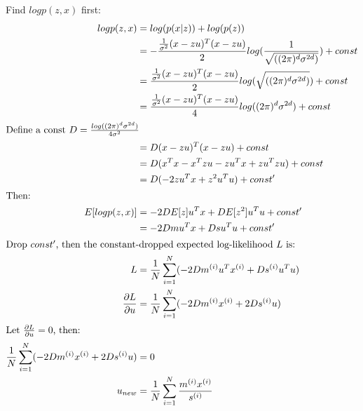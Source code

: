 \documentclass{article}
\begin{document}
\subsection{}
Find $logp(z,x)$ first:
\begin{align*}
    logp(z,x) &= log(p(x|z))+log(p(z))\\
    &= -\frac{\frac{1}{\sigma ^2}(x-zu)^T(x-zu)}{2}log(\frac{1}{\sqrt{((2\pi )^d\sigma ^{2d})}}) + const\\
    &= \frac{\frac{1}{\sigma ^2}(x-zu)^T(x-zu)}{2}log(\sqrt{((2\pi )^d\sigma ^{2d})}) + const\\
    &= \frac{\frac{1}{\sigma ^2}(x-zu)^T(x-zu)}{4}log((2\pi )^d\sigma ^{2d}) + const\\
\intertext{Define a const $D = \frac{log((2\pi )^d\sigma ^{2d})}{4\sigma ^2}$}
    &=D(x-zu)^T(x-zu) + const\\
    &=D(x^Tx-x^Tzu-zu^Tx+zu^Tzu) + const\\
    &=D(-2zu^Tx+z^2u^Tu) + const^\prime\\
\intertext{Then:}
    E[logp(z,x)] &= -2DE[z]u^Tx + DE[z^2]u^Tu + const^\prime\\
                 &= -2Dmu^Tx + Dsu^Tu + const^\prime\\
\intertext{Drop $const^\prime$, then the constant-dropped expected log-likelihood $L$ is:}
    L &= \frac{1}{N}\sum_{i = 1}^{N}(-2Dm^{(i)}u^Tx^{(i)} + Ds^{(i)}u^Tu)\\
    \frac{\partial L}{\partial u} &= \frac{1}{N}\sum_{i = 1}^{N}(-2Dm^{(i)}x^{(i)} + 2Ds^{(i)}u)\\
\intertext{Let $\frac{\partial L}{\partial u} = 0$, then:}
    \frac{1}{N}\sum_{i = 1}^{N}(-2Dm^{(i)}x^{(i)} + 2Ds^{(i)}u) &= 0\\
    u_{new} &= \frac{1}{N}\sum_{i = 1}^{N}\frac{m^{(i)}x^{(i)}}{s^{(i)}}\\
\end{align*}
\end{document}
